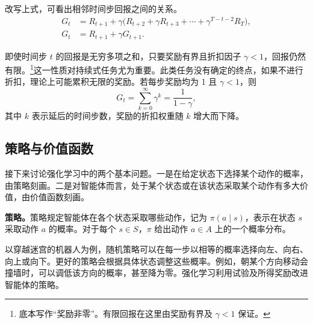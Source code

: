改写上式，可看出相邻时间步回报之间的关系。
\begin{align}
G_t&=R_{t+1}+\gamma\bigl(R_{t+2}+\gamma R_{t+3}
       +\cdots+\gamma^{T-t-2}R_T\bigr),
\label{eq:appb-recursive-expanded}\\
G_t&=R_{t+1}+\gamma G_{t+1}.
\label{eq:appb-recursive-return}
\end{align}

即使时间步 $t$ 的回报是无穷多项之和，只要奖励有界且折扣因子 $\gamma<1$，回报仍然有限。\footnote{底本写作“奖励非零”。有限回报在这里由奖励有界及 $\gamma<1$ 保证。}这一性质对持续式任务尤为重要。此类任务没有确定的终点，如果不进行折扣，理论上可能累积无限的奖励。若每步奖励均为 1 且 $\gamma<1$，则
\begin{equation}
G_t=\sum_{k=0}^{\infty}\gamma^k=\frac{1}{1-\gamma},
\label{eq:appb-geometric-return}
\end{equation}
其中 $k$ 表示延后的时间步数，奖励的折扣权重随 $k$ 增大而下降。

\subsection{策略与价值函数}
\label{sec:appb-policy-value}
接下来讨论强化学习中的两个基本问题。一是在给定状态下选择某个动作的概率，由策略刻画。二是对智能体而言，处于某个状态或在该状态采取某个动作有多大价值，由价值函数刻画。

\textbf{策略。}策略规定智能体在各个状态采取哪些动作，记为 $\pi(a\mid s)$，表示在状态 $s$ 采取动作 $a$ 的概率。对于每个 $s\in S$，$\pi$ 给出动作 $a\in A$ 上的一个概率分布。

以穿越迷宫的机器人为例，随机策略可以在每一步以相等的概率选择向左、向右、向上或向下。更好的策略会根据具体状态调整这些概率。例如，朝某个方向移动会撞墙时，可以调低该方向的概率，甚至降为零。强化学习利用试验及所得奖励改进智能体的策略。

